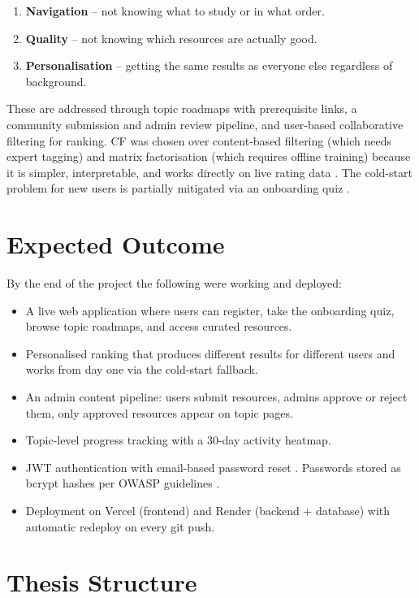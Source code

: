 \documentclass[12pt,a4paper]{report}
\begin{document}
\begin{enumerate}
  \item \textbf{Navigation} -- not knowing what to study or in what order.
  \item \textbf{Quality} -- not knowing which resources are actually good.
  \item \textbf{Personalisation} -- getting the same results as everyone else regardless of background.
\end{enumerate}

These are addressed through topic roadmaps with prerequisite links, a community submission and admin review pipeline, and user-based collaborative filtering for ranking. CF was chosen over content-based filtering (which needs expert tagging) and matrix factorisation (which requires offline training) because it is simpler, interpretable, and works directly on live rating data \cite{herlocker2004}. The cold-start problem for new users is partially mitigated via an onboarding quiz \cite{schein2002}.

\section{Expected Outcome}

By the end of the project the following were working and deployed:

\begin{itemize}
  \item A live web application where users can register, take the onboarding quiz, browse topic roadmaps, and access curated resources.
  \item Personalised ranking that produces different results for different users and works from day one via the cold-start fallback.
  \item An admin content pipeline: users submit resources, admins approve or reject them, only approved resources appear on topic pages.
  \item Topic-level progress tracking with a 30-day activity heatmap.
  \item JWT authentication with email-based password reset \cite{ietfjwt}. Passwords stored as bcrypt hashes per OWASP guidelines \cite{owasp}.
  \item Deployment on Vercel (frontend) and Render (backend + database) with automatic redeploy on every git push.
\end{itemize}

\section{Thesis Structure}
\end{document}
